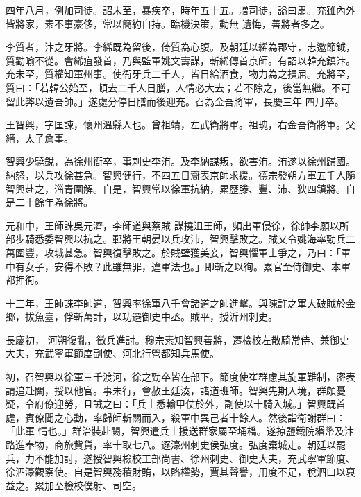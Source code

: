 \begin{pinyinscope}
 四年八月，例加司徒。詔未至，暴疾卒，時年五十五。贈司徒，謚曰肅。充雖內外皆將家，素不事豪侈，常以簡約自持。臨機決策，動無
 遺悔，善將者多之。



 李質者，汴之牙將。李絺既為留後，倚質為心腹。及朝廷以絺為郡守，志邀節鉞，質勸喻不從。會絺疽發首，乃與監軍姚文壽謀，斬絺傳首京師。有詔以韓充鎮汴。充未至，質權知軍州事。使衙牙兵二千人，皆日給酒食，物力為之損屈。充將至，質曰：「若韓公始至，頓去二千人日膳，人情必大去；若不除之，後當無繼。不可留此弊以遺吾帥。」遂處分停日膳而後迎充。召為金吾將軍，長慶三年
 四月卒。



 王智興，字匡諫，懷州溫縣人也。曾祖靖，左武衛將軍。祖瑰，右金吾衛將軍。父縉，太子詹事。



 智興少驍銳，為徐州衙卒，事刺史李洧。及李納謀叛，欲害洧。洧遂以徐州歸國。納怒，以兵攻徐甚急。智興健行，不四五日齎表京師求援。德宗發朔方軍五千人隨智興赴之，淄青圍解。自是，智興常以徐軍抗納，累歷滕、豐、沛、狄四鎮將。自是二十餘年為徐將。



 元和中，王師誅吳元濟，李師道與蔡賊
 謀撓沮王師，頻出軍侵徐，徐帥李願以所部步騎悉委智興以抗之。鄆將王朝晏以兵攻沛，智興擊敗之。賊又令姚海率勁兵二萬圍豐，攻城甚急。智興復擊敗之。於賊壁獲美妾，智興懼軍士爭之，乃曰：「軍中有女子，安得不敗？此雖無罪，違軍法也。」即斬之以徇。累官至侍御史、本軍都押衙。



 十三年，王師誅李師道，智興率徐軍八千會諸道之師進擊。與陳許之軍大破賊於金鄉，拔魚臺，俘斬萬計，以功遷御史中丞。賊平，授沂州刺史。



 長慶初，
 河朔復亂，徵兵進討。穆宗素知智興善將，遷檢校左散騎常侍、兼御史大夫，充武寧軍節度副使、河北行營都知兵馬使。



 初，召智興以徐軍三千渡河，徐之勁卒皆在部下。節度使崔群慮其旋軍難制，密表請追赴闕，授以他官。事未行，會赦王廷湊，諸道班師。智興先期入境，群頗憂疑，令府僚迎勞，且誡之曰：「兵士悉輸甲仗於外，副使以十騎入城。」智興既首處，賓僚聞之心動，率歸師斬關而入，殺軍中異己者十餘人。然後詣衛謝群曰：「此軍
 情也。」群治裝赴闕，智興遣兵士援送群家屬至埇橋。遂掠鹽鐵院緡幣及汴路進奉物，商旅貲貨，率十取七八。逐濠州刺史侯弘度。弘度棄城走。朝廷以罷兵，力不能加討，遂授智興檢校工部尚書、徐州刺史、御史大夫，充武寧軍節度、徐泗濠觀察使。自是智興務積財賄，以賂權勢，賈其聲譽，用度不足，稅泗口以裒益之。累加至檢校僕射、司空。




\end{pinyinscope}
